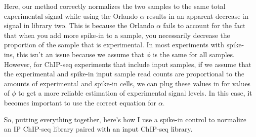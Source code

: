 Here, our method correctly normalizes the two samples to the same total experimental signal while using the Orlando $\alpha$ results in an apparent decrease in signal in library two.
This is because the Orlando $\alpha$ fails to account for the fact that when you add more spike-in to a sample, you necessarily decrease the proportion of the sample that is experimental.
In most experiments with spike-ins, this isn't an issue because we assume that $\phi$ is the same for all samples.
However, for ChIP-seq experiments that include input samples, if we assume that the experimental and spike-in input sample read counts are proportional to the amounts of experimental and spike-in cells, we can plug these values in for values of $\phi$ to get a more reliable estimation of experimental signal levels.
In this case, it becomes important to use the correct equation for $\alpha$.

So, putting everything together, here's how I use a spike-in control to normalize an IP ChIP-seq library paired with an input ChIP-seq library.

